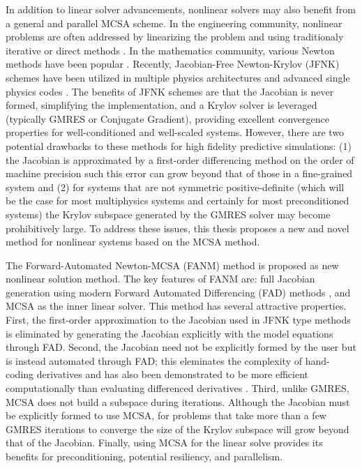 \documentclass[letterpaper,12pt]{article}
\begin{document}
In addition to linear solver advancements, nonlinear solvers may also
benefit from a general and parallel MCSA scheme. In the engineering
community, nonlinear problems are often addressed by linearizing the
problem and using traditionaly iterative or direct methods
\cite{Tannehill_1997}. In the mathematics community, various Newton
methods have been popular \cite{Kelley_1995}. Recently, Jacobian-Free
Newton-Krylov (JFNK) schemes \cite{Knoll_2004} have been utilized in
multiple physics architectures and advanced single physics codes
\cite{Gaston_2009}. The benefits of JFNK schemes are that the Jacobian
is never formed, simplifying the implementation, and a Krylov solver
is leveraged (typically GMRES or Conjugate Gradient), providing
excellent convergence properties for well-conditioned and well-scaled
systems. However, there are two potential drawbacks to these methods
for high fidelity predictive simulations: (1) the Jacobian is
approximated by a first-order differencing method on the order of
machine precision such this error can grow beyond that of those in a
fine-grained system and (2) for systems that are not symmetric
positive-definite (which will be the case for most multiphysics
systems and certainly for most preconditioned systems) the Krylov
subspace generated by the GMRES solver may become prohibitively
large. To address these issues, this thesis proposes a new and novel
method for nonlinear systems based on the MCSA method.

The Forward-Automated Newton-MCSA (FANM) method is proposed as new
nonlinear solution method. The key features of FANM are: full Jacobian
generation using modern Forward Automated Differencing (FAD) methods
\cite{Bartlett_2006}, and MCSA as the inner linear solver. This method
has several attractive properties. First, the first-order
approximation to the Jacobian used in JFNK type methods is eliminated
by generating the Jacobian explicitly with the model equations through
FAD. Second, the Jacobian need not be explicitly formed by the user
but is instead automated through FAD; this eleminates the complexity
of hand-coding derivatives and has also been demonstrated to be more
efficient computationally than evaluating differenced derivatives
\cite{Bartlett_2006}. Third, unlike GMRES, MCSA does not build a
subspace during iterations. Although the Jacobian must be explicitly
formed to use MCSA, for problems that take more than a few GMRES
iterations to converge the size of the Krylov subspace will grow
beyond that of the Jacobian. Finally, using MCSA for the linear solve
provides its benefits for preconditioning, potential resiliency, and
parallelism.
\end{document}
